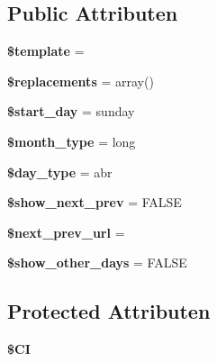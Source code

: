 \subsection*{Public Attributen}
\begin{DoxyCompactItemize}
\item 
\mbox{\label{class_c_i___calendar_aa3e9534005fd516d941f6a5569896e01}} 
{\bfseries \$template} = \textquotesingle{}\textquotesingle{}
\item 
\mbox{\label{class_c_i___calendar_a93cb3f67ace379a71de4fb00bcc7a605}} 
{\bfseries \$replacements} = array()
\item 
\mbox{\label{class_c_i___calendar_ac4e461505bb7cd9a2fdb2bf47560a389}} 
{\bfseries \$start\+\_\+day} = \textquotesingle{}sunday\textquotesingle{}
\item 
\mbox{\label{class_c_i___calendar_ab40961ce0a0e4a7ee10ad389c9566b28}} 
{\bfseries \$month\+\_\+type} = \textquotesingle{}long\textquotesingle{}
\item 
\mbox{\label{class_c_i___calendar_a1e35fdb6b6cc297a6bb256517a8d813d}} 
{\bfseries \$day\+\_\+type} = \textquotesingle{}abr\textquotesingle{}
\item 
\mbox{\label{class_c_i___calendar_aeade2ffe515604c0dffb78d32ca846ae}} 
{\bfseries \$show\+\_\+next\+\_\+prev} = F\+A\+L\+SE
\item 
\mbox{\label{class_c_i___calendar_a3ed0df912e3e67eb17d432c1f54ae2de}} 
{\bfseries \$next\+\_\+prev\+\_\+url} = \textquotesingle{}\textquotesingle{}
\item 
\mbox{\label{class_c_i___calendar_a52c552ab98b51789690522ff7d41ecb7}} 
{\bfseries \$show\+\_\+other\+\_\+days} = F\+A\+L\+SE
\end{DoxyCompactItemize}
\subsection*{Protected Attributen}
\begin{DoxyCompactItemize}
\item 
\mbox{\label{class_c_i___calendar_ae0314d046ddf7fcfaec03222977427d3}} 
{\bfseries \$\+CI}
\end{DoxyCompactItemize}



